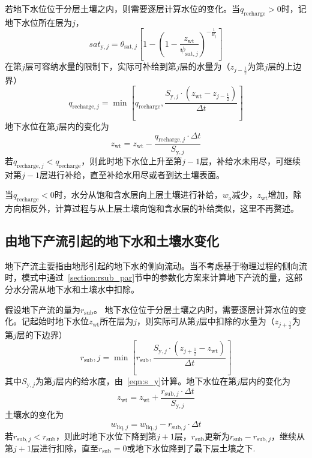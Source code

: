 若地下水位位于分层土壤之内，则需要逐层计算水位的变化。当$q_{\mathrm{recharge}}>0$时，记地下水位所在层为$j$，
\begin{equation}
  {sat}_{\mathrm{y},j}=\theta_{\mathrm{sat},j}\left[1-\left(1-\frac{z_{\mathrm{wt}}}{\psi_{\mathrm{sat},j}}\right)^{-\frac{1}{B_j}}\right]
\end{equation}
在第$j$层可容纳水量的限制下，实际可补给到第$j$层的水量为（$z_{j-\frac{1}{2}}$为第$j$层的上边界）
\begin{equation}
  q_{\mathrm{recharge},j}=\min \left[q_{\mathrm{recharge}}, \frac{S_{\mathrm{y},j} \cdot \left(z_{\mathrm{w t}}-z_{j-\frac{1}{2}}\right)}{\Delta t} \right]
\end{equation}
地下水位在第$j$层内的变化为
\begin{equation}
  z_{\mathrm{w t}}=z_{\mathrm{w t}}-\frac{q_{\mathrm{recharge},j} \cdot \Delta t}{S_{\mathrm{y},j}}
\end{equation}
若$q_{\mathrm{recharge},j}<q_{\mathrm{recharge}}$，则此时地下水位上升至第$j-1$层，补给水未用尽，可继续对第$j-1$层进行补给，直至补给水用尽或者到达土壤表面。

当$q_{\mathrm{recharge}}<0$时，水分从饱和含水层向上层土壤进行补给，$w_{\mathrm {a}} $减少，$z_{\mathrm{wt}}$增加，除方向相反外，计算过程与从上层土壤向饱和含水层的补给类似，这里不再赘述。

\subsection{由地下产流引起的地下水和土壤水变化}

地下产流主要指由地形引起的地下水的侧向流动。当不考虑基于物理过程的侧向流时，模式中通过~\ref{section:rsub_par}节中的参数化方案来计算地下产流的量，这部分水分需从地下水和土壤水中扣除。

假设地下产流的量为$r_{\mathrm{sub}}$。
地下水位位于分层土壤之内时，需要逐层计算水位的变化。记起始时地下水位$z_{\mathrm{wt}}$所在层为$j$，则实际可从第$j$层中扣除的水量为（$z_{j+\frac{1}{2}}$为第$j$层的下边界）
\begin{equation}
  r_{\mathrm{sub}},j = \min \left[r_{\mathrm{sub}}, \frac{S_{\mathrm{y},j} \cdot \left(z_{j+\frac{1}{2}} - z_{\mathrm{w t}}\right)}{\Delta t} \right]
\end{equation}
其中$S_{\mathrm{y},j}$为第$j$层内的给水度，由~\eqref{eqn:s_y}计算。地下水位在第$j$层内的变化为
\begin{equation}
  z_{\mathrm{w t}}=z_{\mathrm{w t}}+\frac{r_{\mathrm{sub},j} \cdot \Delta t}{S_{\mathrm{y},j}}
\end{equation}
土壤水的变化为
\begin{equation}
  w_{\mathrm{liq},j} =  w_{\mathrm{liq},j} - r_{\mathrm{sub},j} \cdot \Delta t
\end{equation}
若$r_{\mathrm{sub},j}<r_{\mathrm{sub}}$，则此时地下水位下降到第$j+1$层，$r_{\mathrm{sub}}$更新为$r_{\mathrm{sub}}-r_{\mathrm{sub},j}$，继续从第$j+1$层进行扣除，直至$r_{\mathrm{sub}}=0$或地下水位降到了最下层土壤之下.

